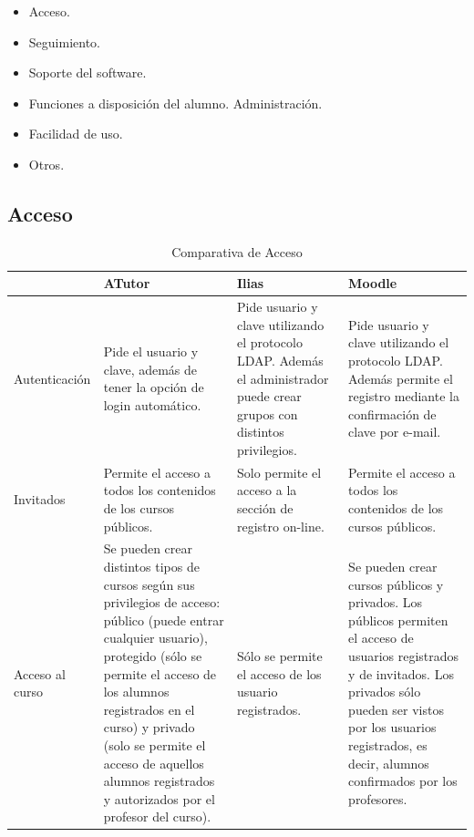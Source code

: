 \begin{itemize}
	\item Acceso.
	\item Seguimiento.
	\item Soporte del software.
	\item Funciones a disposición del alumno. Administración.
	\item Facilidad de uso.
	\item Otros.
\end{itemize}

\newpage
\subsection{Acceso}

\begin{table}[h]
\centering
\begin{tabular}{ | p{} | p{} | p{} | p{} | }
	\hline
	  & \textbf{ATutor} & \textbf{Ilias} & \textbf{Moodle} \\
	\hline 
	Autenticación  & 
	Pide el usuario y clave, además de tener la opción de login automático. & 
	Pide usuario y clave utilizando el protocolo LDAP. Además el administrador puede crear grupos con distintos privilegios.  & 
	Pide usuario y clave utilizando el protocolo LDAP. Además permite el registro mediante la confirmación de clave por e-mail.  \\
	\hline
	Invitados &
	Permite el acceso a todos los contenidos de los cursos públicos. &
	Solo permite el acceso a la sección de registro on-line. &
	Permite el acceso a todos los contenidos de los cursos públicos. \\
	\hline
	Acceso al curso &
	Se pueden crear distintos tipos de cursos según sus privilegios de acceso: público (puede entrar cualquier usuario), protegido (sólo se permite el acceso de los alumnos registrados en el curso) y privado (solo se permite el acceso de aquellos alumnos registrados y autorizados por el profesor del curso). &
	Sólo se permite el acceso de los usuario registrados. &
	Se pueden crear cursos públicos y privados. Los públicos permiten el acceso de usuarios registrados y de invitados. Los privados sólo pueden ser vistos por los usuarios registrados, es decir, alumnos confirmados por los profesores. \\
	\hline
\end{tabular}
\caption{Comparativa de Acceso}
\end{table}

